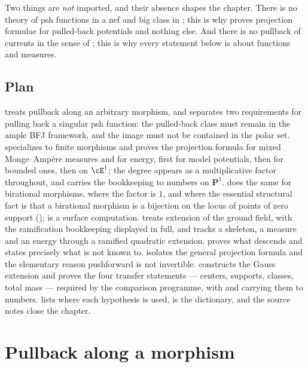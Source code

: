 Two things are \emph{not} imported, and their absence shapes the chapter.
There is no theory of psh functions in a nef and big class in
; this is why  proves projection
formulae for pulled-back potentials and nothing else.  And there is no
pullback of currents in the sense of ; this is why every
statement below is about functions and measures.

\subsection{Plan}
\label{sec:ch30-plan}

 treats pullback along an arbitrary morphism, and
separates two requirements for pulling back a singular psh function: the
pulled-back class must remain in the ample BFJ framework, and the image must
not be contained in the polar set.
 specializes to finite morphisms and proves the
projection formula for mixed Monge--Amp\`ere measures and for energy, first
for model potentials, then for bounded ones, then on $\cE^1$; the degree
appears as a multiplicative factor throughout, and
 carries the bookkeeping to numbers on
$\mathbf P^1$.   does the same for birational
morphisms, where the factor is $1$, and where the essential structural fact
is that a birational morphism is a bijection on the locus of points of zero
support (); 
is a surface computation.   treats extension of
the ground field, with the ramification bookkeeping displayed in full, and
 tracks a skeleton, a measure and an energy
through a ramified quadratic extension.   proves what
descends and states precisely what is not known to.
 isolates the general projection formula and the
elementary reason pushforward is not invertible.  
constructs the Gauss extension and proves the four transfer statements ---
centers, supports, classes, total mass --- required by the comparison
programme, with  and
 carrying them to numbers.
 lists where each hypothesis is used,
 is the dictionary, and the source notes close the
chapter.

\section{Pullback along a morphism}
\label{sec:ch30-pullback}

